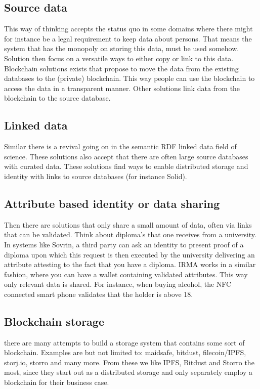 \documentclass{article}
\begin{document}
\subsection{Source data}
This way of thinking accepts the status quo in some domains where there might for instance be a legal requirement to keep data about persons. That means the system that has the monopoly on storing this data, must be used somehow. Solution then focus on a versatile ways to either copy or link to this data. Blockchain solutions exists that propose to move the data from the existing databases to the (private) blockchain. This way people can use the blockchain to access the data in a transparent manner. Other solutions link data from the blockchain to the source database.

\subsection{Linked data}
Similar there is a revival going on in the semantic RDF linked data field of science. These solutions also accept that there are often large source databases with curated data. These solutions find ways to enable distributed storage and identity with links to source databases (for instance Solid).

\subsection{Attribute based identity or data sharing}
Then there are solutions that only share a small amount of data, often via links that can be validated. Think about diploma's that one receives from a university. In systems like Sovrin, a third party can ask an identity to present proof of a diploma upon which this request is then executed by the university delivering an attribute attesting to the fact that you have a diploma. IRMA works in a similar fashion, where you can have a wallet containing validated attributes. This way only relevant data is shared. For instance, when buying alcohol, the NFC connected smart phone validates that the holder is above 18.

\subsection{Blockchain storage}
there are many attempts to build a storage system that contains some sort of blockchain. Examples are but not limited to: maidsafe, bitdust, filecoin/IPFS, storj.io, storro and many more. From these we like IPFS, Bitdust and Storro the most, since they start out as a distributed storage and only separately employ a blockchain for their business case.
\end{document}
